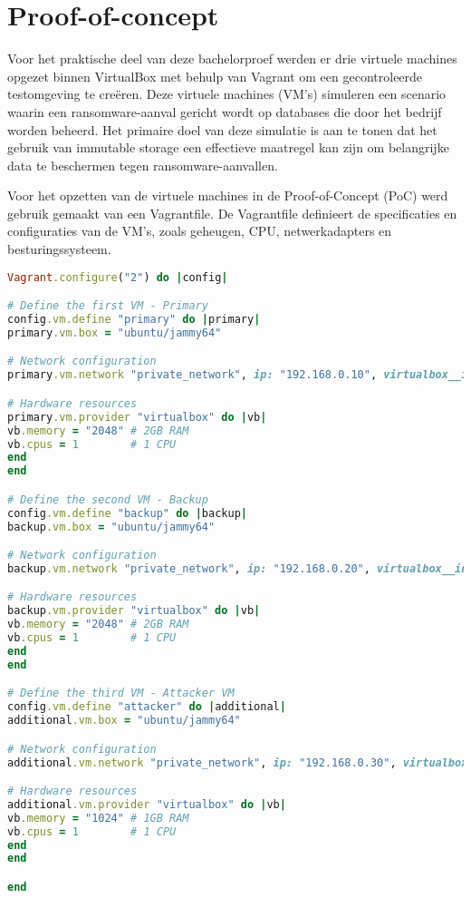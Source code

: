 \chapter{Proof-of-concept}%
\label{ch:poc}
Voor het praktische deel van deze bachelorproef werden er drie virtuele machines opgezet binnen VirtualBox met behulp van Vagrant om een gecontroleerde testomgeving te creëren. Deze virtuele machines (VM’s) simuleren een scenario waarin een ransomware-aanval gericht wordt op databases die door het bedrijf worden beheerd. Het primaire doel van deze simulatie is aan te tonen dat het gebruik van immutable storage een effectieve maatregel kan zijn om belangrijke data te beschermen tegen ransomware-aanvallen.

Voor het opzetten van de virtuele machines in de Proof-of-Concept (PoC) werd gebruik gemaakt van een Vagrantfile. De Vagrantfile definieert de specificaties en configuraties van de VM’s, zoals geheugen, CPU, netwerkadapters en besturingssysteem. 
\begin{lstlisting}[language=Ruby, caption={Vagrantfile voor drie VM's: Backup Server, Client, en Attacker}]
Vagrant.configure("2") do |config|

# Define the first VM - Primary
config.vm.define "primary" do |primary|
primary.vm.box = "ubuntu/jammy64"

# Network configuration
primary.vm.network "private_network", ip: "192.168.0.10", virtualbox__intnet: "internal_network"

# Hardware resources
primary.vm.provider "virtualbox" do |vb|
vb.memory = "2048" # 2GB RAM
vb.cpus = 1        # 1 CPU
end
end

# Define the second VM - Backup
config.vm.define "backup" do |backup|
backup.vm.box = "ubuntu/jammy64"

# Network configuration
backup.vm.network "private_network", ip: "192.168.0.20", virtualbox__intnet: "internal_network"

# Hardware resources
backup.vm.provider "virtualbox" do |vb|
vb.memory = "2048" # 2GB RAM
vb.cpus = 1        # 1 CPU
end
end

# Define the third VM - Attacker VM
config.vm.define "attacker" do |additional|
additional.vm.box = "ubuntu/jammy64"

# Network configuration
additional.vm.network "private_network", ip: "192.168.0.30", virtualbox__intnet: "internal_network"

# Hardware resources
additional.vm.provider "virtualbox" do |vb|
vb.memory = "1024" # 1GB RAM
vb.cpus = 1        # 1 CPU
end
end

end
\end{lstlisting}

